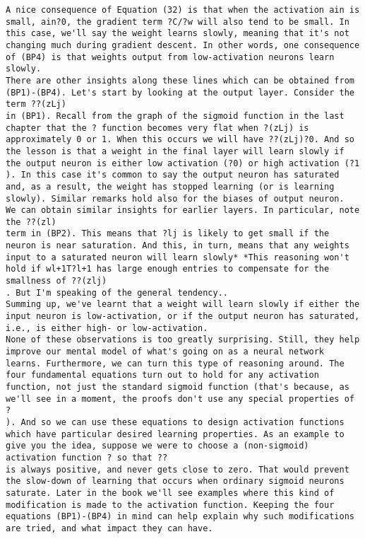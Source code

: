 \begin{lstlisting}
A nice consequence of Equation (32) is that when the activation ain is small, ain?0, the gradient term ?C/?w will also tend to be small. In this case, we'll say the weight learns slowly, meaning that it's not changing much during gradient descent. In other words, one consequence of (BP4) is that weights output from low-activation neurons learn slowly.
There are other insights along these lines which can be obtained from (BP1)-(BP4). Let's start by looking at the output layer. Consider the term ??(zLj)
in (BP1). Recall from the graph of the sigmoid function in the last chapter that the ? function becomes very flat when ?(zLj) is approximately 0 or 1. When this occurs we will have ??(zLj)?0. And so the lesson is that a weight in the final layer will learn slowly if the output neuron is either low activation (?0) or high activation (?1
). In this case it's common to say the output neuron has saturated and, as a result, the weight has stopped learning (or is learning slowly). Similar remarks hold also for the biases of output neuron.
We can obtain similar insights for earlier layers. In particular, note the ??(zl)
term in (BP2). This means that ?lj is likely to get small if the neuron is near saturation. And this, in turn, means that any weights input to a saturated neuron will learn slowly* *This reasoning won't hold if wl+1T?l+1 has large enough entries to compensate for the smallness of ??(zlj)
. But I'm speaking of the general tendency..
Summing up, we've learnt that a weight will learn slowly if either the input neuron is low-activation, or if the output neuron has saturated, i.e., is either high- or low-activation. 
None of these observations is too greatly surprising. Still, they help improve our mental model of what's going on as a neural network learns. Furthermore, we can turn this type of reasoning around. The four fundamental equations turn out to hold for any activation function, not just the standard sigmoid function (that's because, as we'll see in a moment, the proofs don't use any special properties of ?
). And so we can use these equations to design activation functions which have particular desired learning properties. As an example to give you the idea, suppose we were to choose a (non-sigmoid) activation function ? so that ??
is always positive, and never gets close to zero. That would prevent the slow-down of learning that occurs when ordinary sigmoid neurons saturate. Later in the book we'll see examples where this kind of modification is made to the activation function. Keeping the four equations (BP1)-(BP4) in mind can help explain why such modifications are tried, and what impact they can have.


\end{lstlisting}
